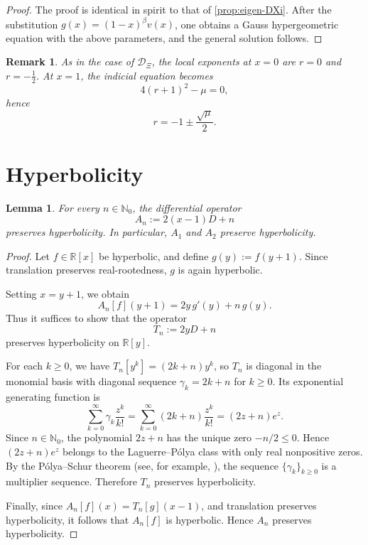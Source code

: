 \documentclass[11pt,twoside]{article}
\newtheorem{lemma}[theorem]{Lemma}
\newtheorem{remark}[theorem]{Remark}
\numberwithin{equation}{section}
\begin{document}
\begin{proof}
The proof is identical in spirit to that of \cref{prop:eigen-DXi}. After the substitution \(g(x)=(1-x)^\beta v(x)\), one obtains a Gauss hypergeometric equation with the above parameters, and the general solution follows.
\end{proof}

\begin{remark}
As in the case of \(\mathcal D_{\Xi}\), the local exponents at \(x=0\) are \(r=0\) and \(r=-\frac12\). At \(x=1\), the indicial equation becomes
\[
4(r+1)^2-\mu=0,
\]
hence
\[
r=-1\pm\frac{\sqrt{\mu}}{2}.
\]
\end{remark}

\section{Hyperbolicity}

\begin{lemma}\label{lem:An-hyperbolicity}
For every \(n \in \mathbb{N}_0\), the differential operator
\[
A_n:=2(x-1)D+n
\]
preserves hyperbolicity. In particular, \(A_1\) and \(A_2\) preserve hyperbolicity.
\end{lemma}

\begin{proof}
Let \(f\in \mathbb{R}[x]\) be hyperbolic, and define \(g(y):=f(y+1)\). Since translation preserves real-rootedness, \(g\) is again hyperbolic.

Setting \(x=y+1\), we obtain
\[
A_n[f](y+1)=2y\,g'(y)+n\,g(y).
\]
Thus it suffices to show that the operator
\[
T_n:=2yD+n
\]
preserves hyperbolicity on \(\mathbb{R}[y]\).

For each \(k\ge 0\), we have \(T_n[y^k]=(2k+n)y^k\), so \(T_n\) is diagonal in the monomial basis with diagonal sequence \(\gamma_k=2k+n\) for \(k\ge 0\). Its exponential generating function is
\[
\sum_{k=0}^\infty \gamma_k \frac{z^k}{k!}
=
\sum_{k=0}^\infty (2k+n)\frac{z^k}{k!}
=
(2z+n)e^z.
\]
Since \(n \in \mathbb{N}_0\), the polynomial \(2z+n\) has the unique zero \(-n/2\le 0\). Hence \((2z+n)e^z\) belongs to the Laguerre--Pólya class with only real nonpositive zeros. By the Pólya--Schur theorem (see, for example, \cite{BorceaBranden2009,RahmanSchmeisser2002}), the sequence \(\{\gamma_k\}_{k\ge0}\) is a multiplier sequence. Therefore \(T_n\) preserves hyperbolicity.

Finally, since \(A_n[f](x)=T_n[g](x-1)\), and translation preserves hyperbolicity, it follows that \(A_n[f]\) is hyperbolic. Hence \(A_n\) preserves hyperbolicity.
\end{proof}
\end{document}
